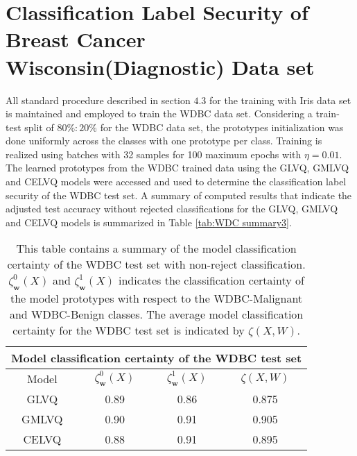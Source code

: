 \section{Classification Label Security of Breast Cancer Wisconsin(Diagnostic) Data set}
All standard procedure described in section $4.3$ for the training with Iris data set is maintained and employed to train the WDBC data set. Considering a train-test split of\hspace{2pt} $80\% : 20\%$\hspace{2pt} for the WDBC data set, the prototypes initialization was done uniformly across the classes with one prototype per class. Training is realized using batches with 32 samples for 100 maximum epochs with $\eta =0.01$. The learned prototypes from the WDBC trained data using the GLVQ, GMLVQ and CELVQ models were accessed and used to determine the classification label security of the WDBC test set. A summary of computed results that indicate the adjusted test accuracy without rejected classifications for the GLVQ, GMLVQ and CELVQ models is summarized in Table \ref{tab:WDC summary3}.
\begin{table}[H]
	\centering
	\begin{tabular}{ |c|c|c|c|  }
		\hline
		\multicolumn{4}{|c|}{Model classification certainty of the WDBC test set} \\
		\hline
		Model &$\zeta_{\mathbf{w}}^{0}(X) $ & $\zeta_{\mathbf{w}}^{1}(X)$ & $\zeta(X,W)$ \\
		\hline
		GLVQ  &0.89  & 0.86   & 0.875  \\
		GMLVQ &0.90  & 0.91    & 0.905  \\
		CELVQ &0.88  & 0.91   & 0.895   \\	
		\hline
	\end{tabular}
	\caption[Summary of model classification certainty of the WDBC test set]{\label{tab:WDBC certainty}This table contains a summary of the model classification certainty of the WDBC test set with non-reject classification.\hspace{2pt} $\zeta_{\mathbf{w}}^{0}(X) $\hspace{2pt} and\hspace{2pt} $\zeta_{\mathbf{w}}^{1}(X)$ \hspace{2pt} indicates the classification certainty of the model prototypes with respect to the WDBC-Malignant and WDBC-Benign classes. The average model classification certainty for the WDBC test set is indicated by\hspace{2pt} $\zeta(X,W)$.}
\end{table}


